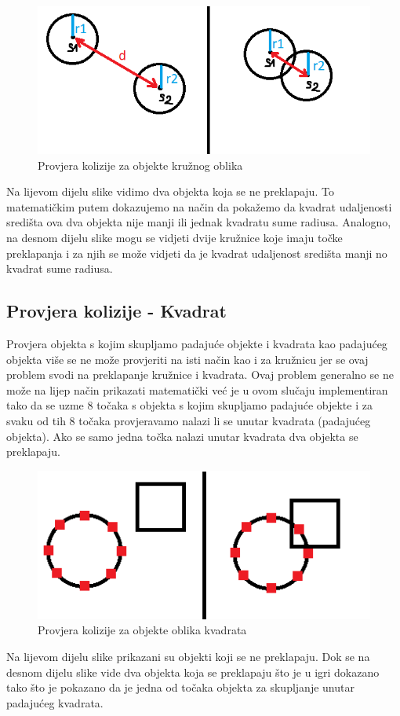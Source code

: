 \documentclass[times, utf8, zavrsni, numeric]{fer}
\begin{document}
		\begin{figure}[H]
			\includegraphics[scale=0.6]{"slike/circlekolizija.png"} 
			\centering
			\caption{Provjera kolizije za objekte kružnog oblika}
			\label{fig:kolizijacircle}
		\end{figure}
	
	Na lijevom dijelu slike vidimo dva objekta koja se ne preklapaju. To matematičkim putem dokazujemo na način da pokažemo da kvadrat udaljenosti središta ova dva objekta nije manji ili jednak kvadratu sume radiusa. Analogno, na desnom dijelu slike
	mogu se vidjeti dvije kružnice koje imaju točke preklapanja i za njih se može vidjeti da je kvadrat udaljenost središta manji no kvadrat sume radiusa. 
	
	\subsection{Provjera kolizije - Kvadrat}
	Provjera objekta s kojim skupljamo padajuće objekte i kvadrata kao padajućeg objekta više se ne može provjeriti na isti način kao i za kružnicu jer se ovaj problem svodi na preklapanje kružnice i kvadrata.
	Ovaj problem generalno se ne može na lijep način prikazati matematički već je u ovom slučaju implementiran tako da se uzme 8 točaka s objekta s kojim skupljamo padajuće objekte i za svaku od tih 8 točaka provjeravamo nalazi li se unutar 
	kvadrata (padajućeg objekta). Ako se samo jedna točka nalazi unutar kvadrata dva objekta se preklapaju. 
	
		\begin{figure}[H]
			\includegraphics[scale=0.6]{"slike/squarekolizija.png"} 
			\centering
			\caption{Provjera kolizije za objekte oblika kvadrata}
			\label{fig:kolizijasquare}
		\end{figure}
		Na lijevom dijelu slike prikazani su objekti koji se ne preklapaju. Dok se na desnom dijelu slike vide dva objekta koja se preklapaju što je u igri dokazano tako što je pokazano da je jedna od točaka objekta za skupljanje unutar padajućeg kvadrata.
	
\end{document}
